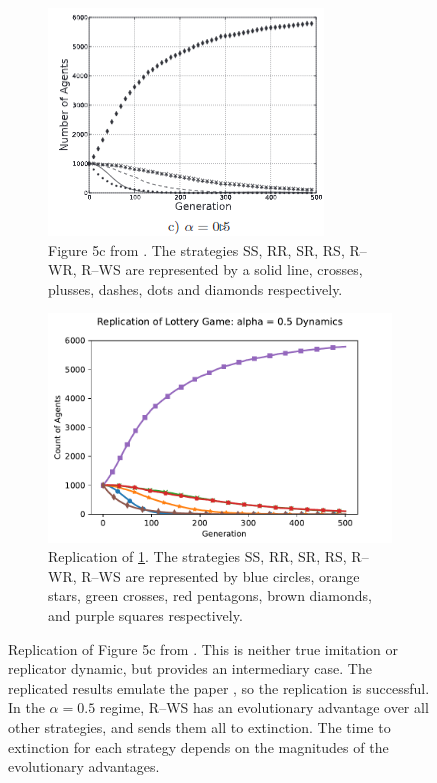 \FloatBarrier 
\begin{figure}[!h]
  \begin{subfigure}[b]{0.45\textwidth}
    \includegraphics[width=\textwidth]{images/lottery3.png}
    \caption{Figure 5c from \cite{RN30}. The strategies SS, RR, SR, RS, R--WR, R--WS are represented by a solid line, crosses, plusses, dashes, dots and diamonds respectively. }
    \label{lottery3}
  \end{subfigure}
  \hfill
  \begin{subfigure}[b]{0.45\textwidth}
    \includegraphics[width=1.25\textwidth]{images/lottery3_me.pdf}
    \caption{Replication of \ref{lottery3}. The strategies SS, RR, SR, RS, R--WR, R--WS are represented by blue circles, orange stars, green crosses, red pentagons, brown diamonds, and purple squares respectively. }
    \label{lottery3_me}
  \end{subfigure}
  \caption{Replication of Figure 5c from \cite{RN30}. This is neither true imitation or replicator dynamic, but provides an intermediary case. The replicated results emulate the paper \cite{RN30}, so the replication is successful. In the $\alpha = 0.5$ regime, R--WS has an evolutionary advantage over all other strategies, and sends them all to extinction. The time to extinction for each strategy depends on the magnitudes of the evolutionary advantages. } \label{lottery_comp2}
\end{figure} 
\FloatBarrier


